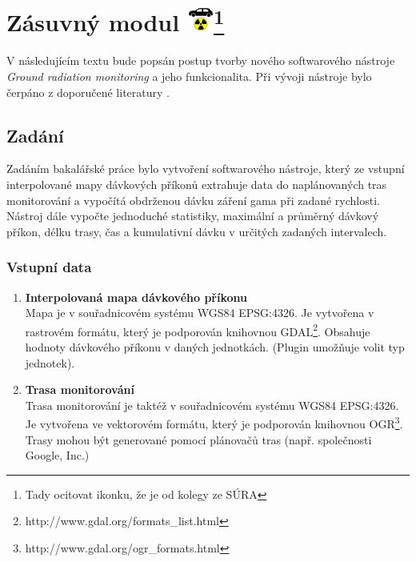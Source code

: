 \chapter[Zásuvný modul]{Zásuvný modul \includegraphics[scale=0.65]{./pictures/ikonka.png}\footnote{Tady ocitovat ikonku, že je od kolegy ze SÚRA}}
\label{4-plugin}

V následujícím textu bude popsán postup tvorby nového softwarového nástroje \textit{Ground radiation monitoring} a jeho funkcionalita. Při vývoji nástroje bylo čerpáno z doporučené literatury \cite{masteringQgis}\cite{diveIntoPython}\cite{rapidPyQt}. 

\section{Zadání}
Zadáním bakalářské práce bylo vytvoření softwarového nástroje, který ze vstupní interpolované mapy dávkových příkonů extrahuje data do naplánovaných tras monitorování a vypočítá obdrženou dávku záření gama při zadané rychlosti. Nástroj dále vypočte jednoduché statistiky, maximální a průměrný dávkový příkon, délku trasy, čas a kumulativní dávku v určitých zadaných intervalech.

\subsection{Vstupní data}
\label{subsec:vstupniData}
\begin{enumerate}
	\item \textbf{Interpolovaná mapa dávkového příkonu} \\
	Mapa je v souřadnicovém systému WGS84 EPSG:4326. Je vytvořena v rastrovém formátu, který je podporován knihovnou GDAL\footnote{http://www.gdal.org/formats\_list.html}. Obsahuje hodnoty dávkového příkonu v daných jednotkách. (Plugin umožňuje volit typ jednotek).  
	\item \textbf{Trasa monitorování} \\
	Trasa monitorování je taktéž v souřadnicovém systému WGS84 EPSG:4326. Je vytvořena ve vektorovém formátu, který je podporován knihovnou OGR\footnote{http://www.gdal.org/ogr\_formats.html}. Trasy mohou být generované pomocí plánovačů tras (např. společnosti Google, Inc.) 
\end{enumerate}

